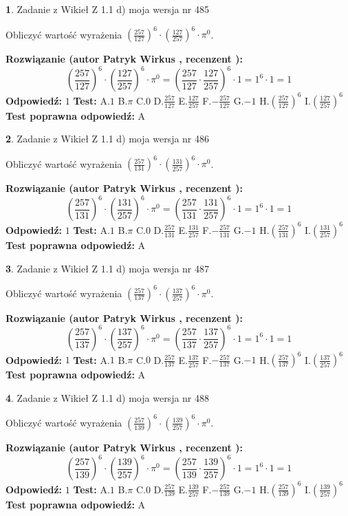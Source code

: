 \documentclass[12pt, a4paper]{article}
\theoremstyle{definition} %
\newtheorem{zad}{}
\newcommand{\zadStart}[1]{\begin{zad}#1\newline}
\newcommand{\zadStop}{\end{zad}}
\newcommand{\rozwStart}[2]{\noindent \textbf{Rozwiązanie (autor #1 , recenzent #2): }\newline}
\newcommand{\rozwStop}{\newline}
\newcommand{\odpStart}{\noindent \textbf{Odpowiedź:}\newline}
\newcommand{\odpStop}{\newline}
\newcommand{\testStart}{\noindent \textbf{Test:}\newline}
\newcommand{\testStop}{\newline}
\newcommand{\kluczStart}{\noindent \textbf{Test poprawna odpowiedź:}\newline}
\newcommand{\kluczStop}{\newline}
\begin{document}
\zadStart{Zadanie z Wikieł Z 1.1 d) moja wersja nr 485}

Obliczyć wartość wyrażenia $(\frac{257}{127})^{6} \cdot (\frac{127}{257})^{6} \cdot \pi^{0}$.
\zadStop
\rozwStart{Patryk Wirkus}{}
$$(\frac{257}{127})^{6} \cdot (\frac{127}{257})^{6} \cdot \pi^{0} = (\frac{257}{127} \cdot \frac{127}{257})^{6} \cdot 1 = 1^{6} \cdot 1 = 1$$
\rozwStop
\odpStart
$1$
\odpStop
\testStart
A.$1$ B.$\pi$ C.$0$ D.$\frac{257}{127}$ E.$\frac{127}{257}$
F.$-\frac{257}{127}$ G.$-1$
H.$(\frac{257}{127})^{6}$
I.$(\frac{127}{257})^{6}$
\testStop
\kluczStart
A
\kluczStop



\zadStart{Zadanie z Wikieł Z 1.1 d) moja wersja nr 486}

Obliczyć wartość wyrażenia $(\frac{257}{131})^{6} \cdot (\frac{131}{257})^{6} \cdot \pi^{0}$.
\zadStop
\rozwStart{Patryk Wirkus}{}
$$(\frac{257}{131})^{6} \cdot (\frac{131}{257})^{6} \cdot \pi^{0} = (\frac{257}{131} \cdot \frac{131}{257})^{6} \cdot 1 = 1^{6} \cdot 1 = 1$$
\rozwStop
\odpStart
$1$
\odpStop
\testStart
A.$1$ B.$\pi$ C.$0$ D.$\frac{257}{131}$ E.$\frac{131}{257}$
F.$-\frac{257}{131}$ G.$-1$
H.$(\frac{257}{131})^{6}$
I.$(\frac{131}{257})^{6}$
\testStop
\kluczStart
A
\kluczStop



\zadStart{Zadanie z Wikieł Z 1.1 d) moja wersja nr 487}

Obliczyć wartość wyrażenia $(\frac{257}{137})^{6} \cdot (\frac{137}{257})^{6} \cdot \pi^{0}$.
\zadStop
\rozwStart{Patryk Wirkus}{}
$$(\frac{257}{137})^{6} \cdot (\frac{137}{257})^{6} \cdot \pi^{0} = (\frac{257}{137} \cdot \frac{137}{257})^{6} \cdot 1 = 1^{6} \cdot 1 = 1$$
\rozwStop
\odpStart
$1$
\odpStop
\testStart
A.$1$ B.$\pi$ C.$0$ D.$\frac{257}{137}$ E.$\frac{137}{257}$
F.$-\frac{257}{137}$ G.$-1$
H.$(\frac{257}{137})^{6}$
I.$(\frac{137}{257})^{6}$
\testStop
\kluczStart
A
\kluczStop



\zadStart{Zadanie z Wikieł Z 1.1 d) moja wersja nr 488}

Obliczyć wartość wyrażenia $(\frac{257}{139})^{6} \cdot (\frac{139}{257})^{6} \cdot \pi^{0}$.
\zadStop
\rozwStart{Patryk Wirkus}{}
$$(\frac{257}{139})^{6} \cdot (\frac{139}{257})^{6} \cdot \pi^{0} = (\frac{257}{139} \cdot \frac{139}{257})^{6} \cdot 1 = 1^{6} \cdot 1 = 1$$
\rozwStop
\odpStart
$1$
\odpStop
\testStart
A.$1$ B.$\pi$ C.$0$ D.$\frac{257}{139}$ E.$\frac{139}{257}$
F.$-\frac{257}{139}$ G.$-1$
H.$(\frac{257}{139})^{6}$
I.$(\frac{139}{257})^{6}$
\testStop
\kluczStart
A
\kluczStop
\end{document}
